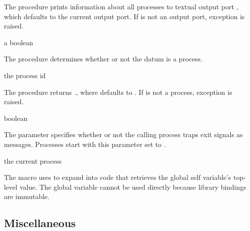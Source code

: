 The  procedure prints information about all processes to
textual output port , which defaults to the current output
port. If  is not an output port, exception  is raised.

\begin{procedure}
\end{procedure}
\returns{} a boolean

The  procedure determines whether or not the datum
 is a process.

\begin{procedure}
\end{procedure}
\returns{} the process id

The  procedure returns .,
where  defaults to . If  is not
a process, exception  is
raised.

\begin{parameter}
\end{parameter}
\hasvalue{} boolean

The  parameter specifies whether or not the
calling process traps exit signals as messages. Processes start with
this parameter set to .

\begin{syntax}
\end{syntax}
\returns{} the current process

The  macro uses  to expand into
code that retrieves the global self variable's top-level value. The
global variable cannot be used directly because library bindings are
immutable.

\subsection{Miscellaneous}

